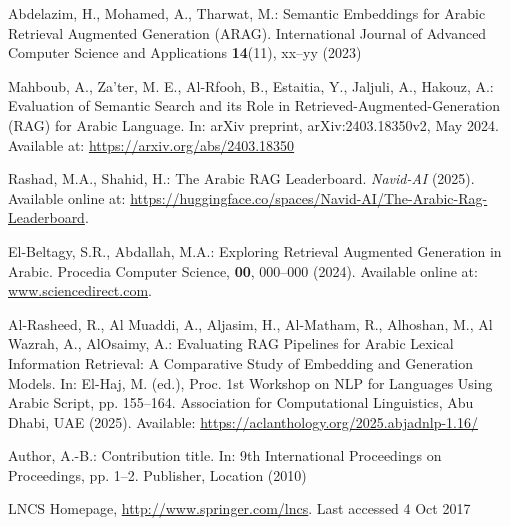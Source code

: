 \documentclass[runningheads]{llncs}
\begin{document}
%
%
%
% 
% 
%
\newpage
\begin{thebibliography}{8}
Abdelazim, H., Mohamed, A., Tharwat, M.: Semantic Embeddings for Arabic Retrieval Augmented Generation (ARAG). International Journal of Advanced Computer Science and Applications \textbf{14}(11), xx--yy (2023)


Mahboub, A., Za’ter, M. E., Al-Rfooh, B., Estaitia, Y., Jaljuli, A., Hakouz, A.:  
Evaluation of Semantic Search and its Role in Retrieved-Augmented-Generation (RAG) for Arabic Language.  
In: arXiv preprint, arXiv:2403.18350v2, May 2024. Available at: \url{https://arxiv.org/abs/2403.18350}

Rashad, M.A., Shahid, H.: The Arabic RAG Leaderboard. \textit{Navid-AI} (2025). Available online at: \url{https://huggingface.co/spaces/Navid-AI/The-Arabic-Rag-Leaderboard}.


El-Beltagy, S.R., Abdallah, M.A.: Exploring Retrieval Augmented Generation in Arabic. Procedia Computer Science, \textbf{00}, 000--000 (2024). Available online at: \url{www.sciencedirect.com}.

Al-Rasheed, R., Al Muaddi, A., Aljasim, H., Al-Matham, R., Alhoshan, M., Al Wazrah, A., AlOsaimy, A.:  
Evaluating RAG Pipelines for Arabic Lexical Information Retrieval: A Comparative Study of Embedding and Generation Models.  
In: El-Haj, M. (ed.), Proc. 1st Workshop on NLP for Languages Using Arabic Script, pp. 155--164.  
Association for Computational Linguistics, Abu Dhabi, UAE (2025).  
Available: \url{https://aclanthology.org/2025.abjadnlp-1.16/}  




Author, A.-B.: Contribution title. In: 9th International Proceedings
on Proceedings, pp. 1--2. Publisher, Location (2010)

LNCS Homepage, \url{http://www.springer.com/lncs}. Last accessed 4
Oct 2017
\end{thebibliography}
\end{document}
